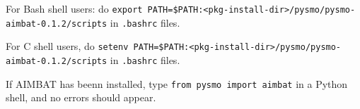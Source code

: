 \documentclass[letterpaper,10pt]{article}
\begin{document}
For Bash shell users: do \verb"export PATH=$PATH:<pkg-install-dir>/pysmo/pysmo-aimbat-0.1.2/scripts" in \verb".bashrc" files.

For C shell users, do \verb"setenv PATH=$PATH:<pkg-install-dir>/pysmo/pysmo-aimbat-0.1.2/scripts" in \verb".bashrc" files.

If AIMBAT has beenn installed, type \verb"from pysmo import aimbat" in a Python shell, and no errors should appear. 





















\end{document}
